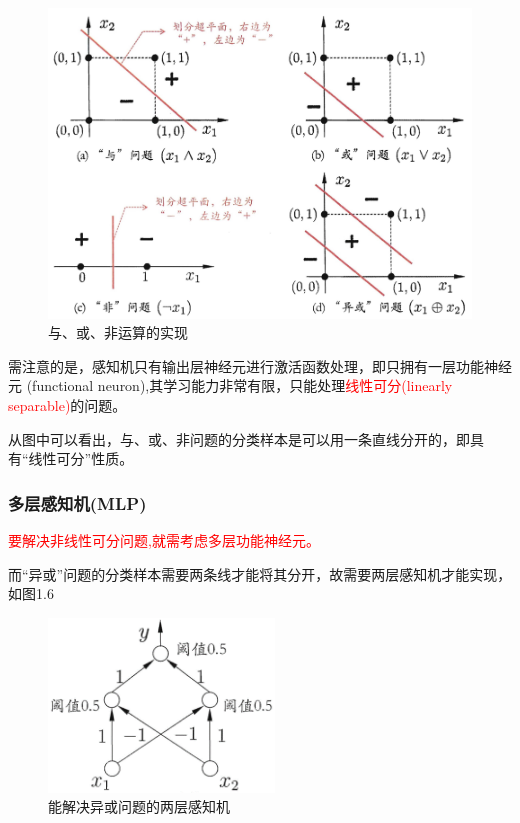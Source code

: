 \begin{figure}[h]
\small
\centering
\includegraphics[width=14cm]{figure//5.png}
\caption{与、或、非运算的实现} \label{fig:5}
\end{figure}

需注意的是，感知机只有输出层神经元进行激活函数处理，即只拥有一层功能神经元 (functional neuron),其学习能力非常有限，只能处理\textcolor{red}{线性可分(linearly separable)}的问题。

从图中可以看出，与、或、非问题的分类样本是可以用一条直线分开的，即具有“线性可分”性质。



\subsubsection{多层感知机(MLP)}

\textcolor{red}{要解决非线性可分问题,就需考虑多层功能神经元。}

而“异或”问题的分类样本需要两条线才能将其分开，故需要两层感知机才能实现，如图1.6

\begin{figure}[h]
\small
\centering
\includegraphics[width=6cm]{figure//6.png}
\caption{能解决异或问题的两层感知机} \label{fig:6}
\end{figure}

